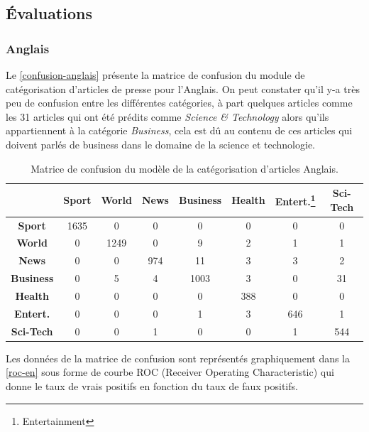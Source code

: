 \subsection{Évaluations}
    \subsubsection{Anglais}
    Le \autoref{confusion-anglais} présente la matrice de confusion du module de catégorisation d'articles de presse pour l'Anglais. On peut constater qu'il y-a très peu de confusion entre les différentes catégories, à part quelques articles comme les 31 articles qui ont été prédits comme \emph{Science \& Technology} alors qu'ils appartiennent à la catégorie \emph{Business}, cela est dû au contenu de ces articles qui doivent parlés de business dans le domaine de la science et technologie. 
    \begin{table}[H]
        \begin{center}
            \begin{tabular}{|c|c|c|c|c|c|c|c|}
                \cline{2-8}
                \multicolumn{1}{c|}{} & \textbf{Sport} &  \textbf{World} &  \textbf{News} &  \textbf{Business} &  \textbf{Health} & \textbf{Entert.\footnote{Entertainment}} &  \textbf{Sci-Tech} \\
                \hline
                \textbf{Sport} & 1635 & 0 & 0 & 0 & 0 & 0 & 0 \\
                \textbf{World}  & 0 & 1249 & 0 & 9 & 2 & 1 & 1 \\
                \textbf{News}  & 0 & 0 & 974 & 11 & 3 & 3 & 2 \\
                \textbf{Business}  & 0 & 5 & 4 & 1003 & 3 & 0 & 31 \\
                \textbf{Health}  & 0 & 0 & 0 & 0 & 388 & 0 & 0 \\
                \textbf{Entert.}  & 0 & 0 & 0 & 1 & 3 & 646 & 1 \\
                \textbf{Sci-Tech}  & 0 & 0 & 1 & 0 & 0 & 1 & 544 \\
                \hline
            \end{tabular}
        \end{center}
        \caption{Matrice de confusion du modèle de la catégorisation d'articles Anglais.}
        \label{confusion-anglais}
    \end{table}
    Les données de la matrice de confusion sont représentés graphiquement dans la \autoref{roc-en} sous forme de courbe ROC (Receiver Operating Characteristic) qui donne le taux de vrais positifs  en fonction du taux de faux positifs.
